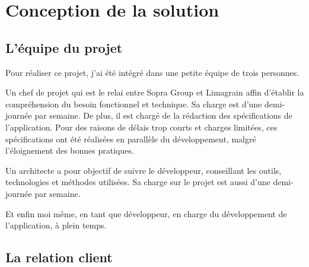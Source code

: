 \cleardoublepage

\chapter{Conception de la solution}


\section{L'équipe du projet}

Pour réaliser ce projet, j'ai été intégré dans une petite équipe de trois personnes.

Un chef de projet qui est le relai entre Sopra Group et Limagrain affin d'établir la compréhension du besoin fonctionnel et technique. Sa charge est d'une demi-journée par semaine. De plus, il est chargé de la rédaction des spécifications de l'application. Pour des raisons de délais trop courts et charges limitées, ces spécifications ont été réalisées en parallèle du développement, malgré l'éloignement des bonnes pratiques.

Un architecte a pour objectif de suivre le développeur, conseillant les outils, technologies et méthodes utilisées. Sa charge sur le projet est aussi d'une demi-journée par semaine.

Et enfin moi même, en tant que développeur, en charge du développement de l'application, à plein temps.


\section{La relation client}


